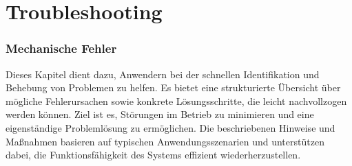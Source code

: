 %
%

\chapter{Troubleshooting}
\subsection{Mechanische Fehler} 
Dieses Kapitel dient dazu, Anwendern bei der schnellen Identifikation und Behebung von Problemen zu helfen. Es bietet eine strukturierte Übersicht über mögliche Fehlerursachen sowie konkrete Lösungsschritte, die leicht nachvollzogen werden können. Ziel ist es, Störungen im Betrieb zu minimieren und eine eigenständige Problemlösung zu ermöglichen. Die beschriebenen Hinweise und Maßnahmen basieren auf typischen Anwendungsszenarien und unterstützen dabei, die Funktionsfähigkeit des Systems effizient wiederherzustellen.
